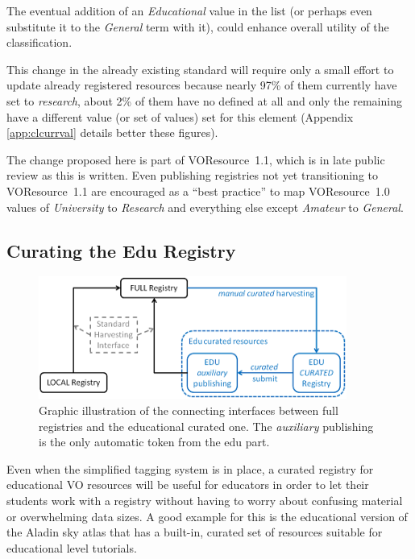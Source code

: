 \documentclass{ivoa}
\begin{document}
The eventual
addition of an 
\emph{Educational}
value in the list (or perhaps even
substitute it to the 
\emph{General} term with it),
could enhance overall utility of the classification.
  


This change in the already existing standard will require only 
a small effort to update already registered resources because nearly 97\% of 
them currently have  set to 
\emph{research}, about 2\% of them have
no  defined at all and only the remaining have a different value
(or set of values) set for this element (Appendix \ref{app:clcurrval} details better these
figures).
  

The change proposed here is part of VOResource~1.1, which is in late
public review as this is written.  Even publishing registries not yet
transitioning to VOResource~1.1 are encouraged as
a ``best practice'' to map VOResource~1.0
 values 
  of 
\emph{University}
 to 
\emph{Research}
 and
  everything else except 
\emph{Amateur}
 to 
\emph{General}.



\subsection{Curating the Edu Registry}

\label{sect:edureg}

\begin{figure}

\includegraphics[width=0.9\textwidth]{curation.png}
\caption{Graphic illustration
    of the connecting interfaces between full registries and the educational
    curated one. The 
\emph{auxiliary}
 publishing is the only automatic token
    from the edu part.}
\label{fig:curation}
\end{figure}




Even when the simplified 
tagging system is in place,
a curated registry for educational VO resources will be useful for
educators in order to let their students work with a registry without having to
worry about confusing material or overwhelming data sizes. A good example
for this is the educational version of the Aladin sky atlas that has a
built-in, curated set of resources suitable for educational level 
tutorials.
  
\end{document}
